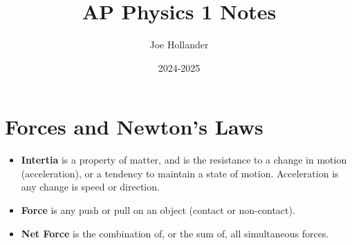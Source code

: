 \documentclass{article}
\title{AP Physics 1 Notes}
\author{Joe Hollander}
\date{2024-2025}
\begin{document}
\maketitle 

\section*{Forces and Newton's Laws}
\begin{itemize} 
    \item \textbf{Intertia} is a property of matter, 
and is the resistance to a change in motion (acceleration),
or a tendency to maintain a state of motion. 
Acceleration is any change is speed or direction.

    \item \textbf{Force} is any push or pull on an object (contact or non-contact).
    \item \textbf{Net Force} is the combination of, or the sum of, all simultaneous forces.
\end{itemize}
\end{document}

